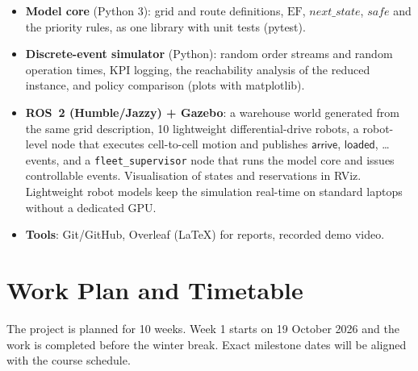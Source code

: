 \documentclass[11pt,a4paper]{article}
\newcommand{\ev}[1]{\mathsf{#1}}            %
\newcommand{\EF}{\mathrm{EF}}
\begin{document}
\begin{itemize}[leftmargin=*]
  \item \textbf{Model core} (Python 3): grid and route definitions, $\EF$,
        $\mathit{next\_state}$, $\mathit{safe}$ and the priority rules, as one
        library with unit tests (pytest).
  \item \textbf{Discrete-event simulator} (Python): random order streams and
        random operation times, KPI logging, the reachability analysis
        of the reduced instance, and policy comparison (plots with
        matplotlib).
  \item \textbf{ROS~2 (Humble/Jazzy) + Gazebo}: a warehouse world generated from
        the same grid description, 10 lightweight differential-drive
        robots, a robot-level node that executes cell-to-cell motion and
        publishes $\ev{arrive}$, $\ev{loaded}$, \dots{} events, and a
        \texttt{fleet\_supervisor} node that runs the model core and issues
        controllable events. Visualisation of states and reservations in RViz.
        Lightweight robot models keep the simulation real-time on standard
        laptops without a dedicated GPU.
  \item \textbf{Tools}: Git/GitHub, Overleaf (\LaTeX) for reports,
        recorded demo video.
\end{itemize}

\section{Work Plan and Timetable}

The project is planned for 10 weeks. Week 1 starts on 19 October 2026 and
the work is completed before the winter break. Exact milestone dates will be
aligned with the course schedule.
\end{document}
